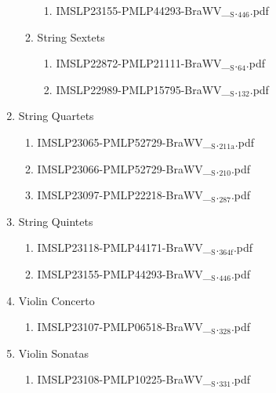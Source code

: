 \documentclass[11pt]{article}
\begin{document}
\begin{enumerate}
\begin{enumerate}
\begin{enumerate}
\item IMSLP23155-PMLP44293-BraWV\_$_{\text{S}}$.$_{\text{446}}$.pdf
\label{sec-1-1-1-1-44-15-12-2-2}
\end{enumerate}

\item String Sextets
\label{sec-1-1-1-1-44-15-12-3}
\begin{enumerate}
\item IMSLP22872-PMLP21111-BraWV\_$_{\text{S}}$.$_{\text{64}}$.pdf
\label{sec-1-1-1-1-44-15-12-3-1}

\item IMSLP22989-PMLP15795-BraWV\_$_{\text{S}}$.$_{\text{132}}$.pdf
\label{sec-1-1-1-1-44-15-12-3-2}
\end{enumerate}
\end{enumerate}

\item String Quartets
\label{sec-1-1-1-1-44-15-13}
\begin{enumerate}
\item IMSLP23065-PMLP52729-BraWV\_$_{\text{S}}$.$_{\text{211a}}$.pdf
\label{sec-1-1-1-1-44-15-13-1}

\item IMSLP23066-PMLP52729-BraWV\_$_{\text{S}}$.$_{\text{210}}$.pdf
\label{sec-1-1-1-1-44-15-13-2}

\item IMSLP23097-PMLP22218-BraWV\_$_{\text{S}}$.$_{\text{287}}$.pdf
\label{sec-1-1-1-1-44-15-13-3}
\end{enumerate}

\item String Quintets
\label{sec-1-1-1-1-44-15-14}
\begin{enumerate}
\item IMSLP23118-PMLP44171-BraWV\_$_{\text{S}}$.$_{\text{364f}}$.pdf
\label{sec-1-1-1-1-44-15-14-1}

\item IMSLP23155-PMLP44293-BraWV\_$_{\text{S}}$.$_{\text{446}}$.pdf
\label{sec-1-1-1-1-44-15-14-2}
\end{enumerate}

\item Violin Concerto
\label{sec-1-1-1-1-44-15-15}
\begin{enumerate}
\item IMSLP23107-PMLP06518-BraWV\_$_{\text{S}}$.$_{\text{328}}$.pdf
\label{sec-1-1-1-1-44-15-15-1}
\end{enumerate}

\item Violin Sonatas
\label{sec-1-1-1-1-44-15-16}
\begin{enumerate}
\item IMSLP23108-PMLP10225-BraWV\_$_{\text{S}}$.$_{\text{331}}$.pdf
\label{sec-1-1-1-1-44-15-16-1}


\end{enumerate}
\end{enumerate}
\end{document}
